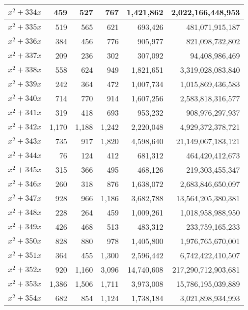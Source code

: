 \documentclass[a4paper]{amsproc}
\theoremstyle{plain}
\begin{document}
\begin{longtable}{ | l | r | r | r | r | r | }
$x^2 + 334x$ & 459 & 527 & 767 & 1{,}421{,}862 & 2{,}022{,}166{,}448{,}953 \\ \hline
$x^2 + 335x$ & 519 & 565 & 621 & 693{,}426 & 481{,}071{,}915{,}187 \\ \hline
$x^2 + 336x$ & 384 & 456 & 776 & 905{,}977 & 821{,}098{,}732{,}802 \\ \hline
$x^2 + 337x$ & 209 & 236 & 302 & 307{,}092 & 94{,}408{,}986{,}469 \\ \hline
$x^2 + 338x$ & 558 & 624 & 949 & 1{,}821{,}651 & 3{,}319{,}028{,}083{,}840 \\ \hline
$x^2 + 339x$ & 242 & 364 & 472 & 1{,}007{,}734 & 1{,}015{,}869{,}436{,}583 \\ \hline
$x^2 + 340x$ & 714 & 770 & 914 & 1{,}607{,}256 & 2{,}583{,}818{,}316{,}577 \\ \hline
$x^2 + 341x$ & 319 & 418 & 693 & 953{,}232 & 908{,}976{,}297{,}937 \\ \hline
$x^2 + 342x$ & 1{,}170 & 1{,}188 & 1{,}242 & 2{,}220{,}048 & 4{,}929{,}372{,}378{,}721 \\ \hline
$x^2 + 343x$ & 735 & 917 & 1{,}820 & 4{,}598{,}640 & 21{,}149{,}067{,}183{,}121 \\ \hline
$x^2 + 344x$ & 76 & 124 & 412 & 681{,}312 & 464{,}420{,}412{,}673 \\ \hline
$x^2 + 345x$ & 315 & 366 & 495 & 468{,}126 & 219{,}303{,}455{,}347 \\ \hline
$x^2 + 346x$ & 260 & 318 & 876 & 1{,}638{,}072 & 2{,}683{,}846{,}650{,}097 \\ \hline
$x^2 + 347x$ & 928 & 966 & 1{,}186 & 3{,}682{,}788 & 13{,}564{,}205{,}380{,}381 \\ \hline
$x^2 + 348x$ & 228 & 264 & 459 & 1{,}009{,}261 & 1{,}018{,}958{,}988{,}950 \\ \hline
$x^2 + 349x$ & 426 & 468 & 513 & 483{,}312 & 233{,}759{,}165{,}233 \\ \hline
$x^2 + 350x$ & 828 & 880 & 978 & 1{,}405{,}800 & 1{,}976{,}765{,}670{,}001 \\ \hline
$x^2 + 351x$ & 364 & 455 & 1{,}300 & 2{,}596{,}442 & 6{,}742{,}422{,}410{,}507 \\ \hline
$x^2 + 352x$ & 920 & 1{,}160 & 3{,}096 & 14{,}740{,}608 & 217{,}290{,}712{,}903{,}681 \\ \hline
$x^2 + 353x$ & 1{,}386 & 1{,}506 & 1{,}711 & 3{,}973{,}008 & 15{,}786{,}195{,}039{,}889 \\ \hline
$x^2 + 354x$ & 682 & 854 & 1{,}124 & 1{,}738{,}184 & 3{,}021{,}898{,}934{,}993 \\ \hline

\end{longtable}
\end{document}
